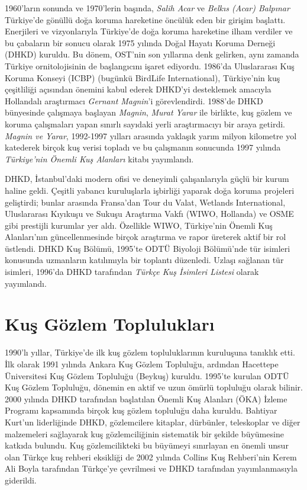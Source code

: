 \documentclass[
  a4paper,
  DIV=11,
  numbers=noendperiod]{scrartcl}
\begin{document}
1960'ların sonunda ve 1970'lerin başında, \emph{Salih Acar} ve
\emph{Belkıs (Acar) Balpınar} Türkiye'de gönüllü doğa koruma hareketine
öncülük eden bir girişim başlattı. Enerjileri ve vizyonlarıyla
Türkiye'de doğa koruma hareketine ilham verdiler ve bu çabaların bir
sonucu olarak 1975 yılında Doğal Hayatı Koruma Derneği (DHKD) kuruldu.
Bu dönem, OST'nin son yıllarına denk gelirken, aynı zamanda Türkiye
ornitolojisinin de başlangıcını işaret ediyordu. 1986'da Uluslararası
Kuş Koruma Konseyi (ICBP) (bugünkü BirdLife International), Türkiye'nin
kuş çeşitliliği açısından önemini kabul ederek DHKD'yi desteklemek
amacıyla Hollandalı araştırmacı \emph{Gernant Magnin}'i görevlendirdi.
1988'de DHKD bünyesinde çalışmaya başlayan \emph{Magnin}, \emph{Murat
Yarar} ile birlikte, kuş gözlem ve koruma çalışmaları yapan sınırlı
sayıdaki yerli araştırmacıyı bir araya getirdi. \emph{Magnin ve Yarar},
1992-1997 yılları arasında yaklaşık yarım milyon kilometre yol katederek
birçok kuş verisi topladı ve bu çalışmanın sonucunda 1997 yılında
\emph{Türkiye'nin Önemli Kuş Alanları} kitabı yayımlandı.

DHKD, İstanbul'daki modern ofisi ve deneyimli çalışanlarıyla güçlü bir
kurum haline geldi. Çeşitli yabancı kuruluşlarla işbirliği yaparak doğa
koruma projeleri geliştirdi; bunlar arasında Fransa'dan Tour du Valat,
Wetlands International, Uluslararası Kıyıkuşu ve Sukuşu Araştırma Vakfı
(WIWO, Hollanda) ve OSME gibi prestijli kurumlar yer aldı. Özellikle
WIWO, Türkiye'nin Önemli Kuş Alanları'nın güncellenmesinde birçok
araştırma ve rapor üreterek aktif bir rol üstlendi. DHKD Kuş Bölümü,
1995'te ODTÜ Biyoloji Bölümü'nde tür isimleri konusunda uzmanların
katılımıyla bir toplantı düzenledi. Uzlaşı sağlanan tür isimleri,
1996'da DHKD tarafından \emph{Türkçe Kuş İsimleri Listesi} olarak
yayımlandı.

\section*{Kuş Gözlem
Toplulukları}\label{kuux15f-guxf6zlem-topluluklarux131}


1990'lı yıllar, Türkiye'de ilk kuş gözlem topluluklarının kuruluşuna
tanıklık etti. İlk olarak 1991 yılında Ankara Kuş Gözlem Topluluğu,
ardından Hacettepe Üniversitesi Kuş Gözlem Topluluğu (Beykuş) kuruldu.
1995'te kurulan ODTÜ Kuş Gözlem Topluluğu, dönemin en aktif ve uzun
ömürlü topluluğu olarak bilinir. 2000 yılında DHKD tarafından başlatılan
Önemli Kuş Alanları (ÖKA) İzleme Programı kapsamında birçok kuş gözlem
topluluğu daha kuruldu. Bahtiyar Kurt'un liderliğinde DHKD, gözlemcilere
kitaplar, dürbünler, teleskoplar ve diğer malzemeleri sağlayarak kuş
gözlemciliğinin sistematik bir şekilde büyümesine katkıda bulundu. Kuş
gözlemcilikteki bu büyümeyi sınırlayan en önemli unsur olan Türkçe kuş
rehberi eksikliği de 2002 yılında Collins Kuş Rehberi'nin Kerem Ali
Boyla tarafından Türkçe'ye çevrilmesi ve DHKD tarafından yayımlanmasıyla
giderildi.
\end{document}
